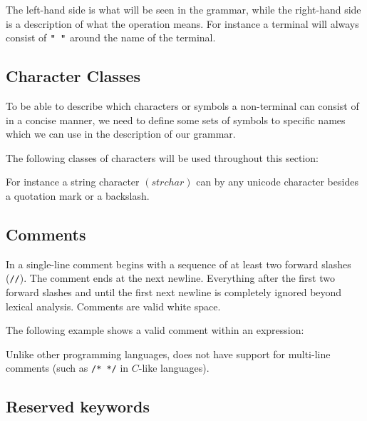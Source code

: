 The left-hand side is what will be seen in the grammar, while the right-hand
side is a description of what the operation means. For instance  a terminal will
always consist of $\texttt{" "}$ around the name of the terminal.

\subsection{Character Classes}
To be able to describe which characters or symbols a non-terminal can consist of
in a concise manner, we need to define some sets of symbols to specific names
which we can use in the description of our grammar.

The following classes of characters will be used throughout this section:

\begin{ebnf}
\end{ebnf}

For instance a string character $\left(strchar\right)$ can by any
unicode character besides a quotation mark or a backslash. 

\subsection{Comments}
\label{sec:comments}
In \productname{} a single-line comment begins with a sequence of at least two
forward slashes (\texttt{//}). The comment ends at the next newline. Everything
after the first two forward slashes and until the first next newline is
completely ignored beyond lexical analysis. Comments are valid
white space.

The following example shows a valid comment within an expression:


Unlike other programming languages, \productname{} does not have support for
multi-line comments (such as \texttt{/* */} in $C$-like languages).

\subsection{Reserved keywords}

